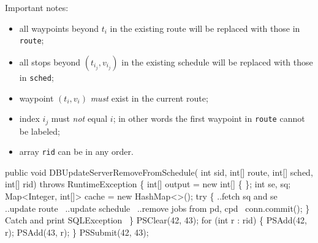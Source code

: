 \documentclass{article}
\def\nwendcode{\endtrivlist \endgroup}
\let\nwdocspar=\par
\theoremstyle{definition}
\begin{document}
Important notes:
\begin{itemize}
\item all waypoints beyond $t_i$ in the existing route will be replaced with
those in {\tt{}route};
\item all stops beyond $(t_{i_j},v_{i_j})$ in the existing schedule will be
replaced with those in {\tt{}sched};
\item waypoint $(t_i,v_i)$ \emph{must} exist in the current route;
\item index $i_j$ must \emph{not} equal $i$; in other words the first waypoint
in {\tt{}route} cannot be labeled;
\item array {\tt{}rid} can be in any order.
\end{itemize}
\nwenddocs{}\endmoddef{}
public void DBUpdateServerRemoveFromSchedule(
    int sid, int[] route, int[] sched, int[] rid)
throws RuntimeException \{
  int[] output = new int[] \{ \};
  int se, sq;
  Map<Integer, int[]> cache = new HashMap<>();
  try \{
    \LA{}..fetch \code{}sq\edoc{} and \code{}se\edoc{}~{\nwtagstyle{}}\RA{}
    \LA{}..update route~{\nwtagstyle{}}\RA{}
    \LA{}..update schedule~{\nwtagstyle{}}\RA{}
    \LA{}..remove jobs from pd, cpd~{\nwtagstyle{}}\RA{}
    conn.commit();
  \}
  \LA{}Catch and print \code{}SQLException\edoc{}~{\nwtagstyle{}}\RA{}
\}
\eatline
{}\nwendcode{}\endmoddef{}
PSClear(42, 43);
for (int r : rid) \{
  PSAdd(42, r);
  PSAdd(43, r);
\}
PSSubmit(42, 43);
\nwendcode{}\nwdocspar
\end{document}
